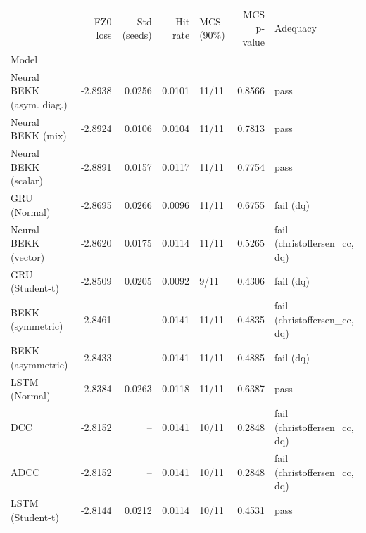 \begin{tabular}{lrrrlrl}
\toprule
 & FZ0 loss & Std (seeds) & Hit rate & MCS (90\%) & MCS p-value & Adequacy \\
Model &  &  &  &  &  &  \\
\midrule
Neural BEKK (asym. diag.) & -2.8938 & 0.0256 & 0.0101 & 11/11 & 0.8566 & pass \\
Neural BEKK (mix) & -2.8924 & 0.0106 & 0.0104 & 11/11 & 0.7813 & pass \\
Neural BEKK (scalar) & -2.8891 & 0.0157 & 0.0117 & 11/11 & 0.7754 & pass \\
GRU (Normal) & -2.8695 & 0.0266 & 0.0096 & 11/11 & 0.6755 & fail (dq) \\
Neural BEKK (vector) & -2.8620 & 0.0175 & 0.0114 & 11/11 & 0.5265 & fail (christoffersen\_cc, dq) \\
GRU (Student-t) & -2.8509 & 0.0205 & 0.0092 & 9/11 & 0.4306 & fail (dq) \\
BEKK (symmetric) & -2.8461 & -- & 0.0141 & 11/11 & 0.4835 & fail (christoffersen\_cc, dq) \\
BEKK (asymmetric) & -2.8433 & -- & 0.0141 & 11/11 & 0.4885 & fail (dq) \\
LSTM (Normal) & -2.8384 & 0.0263 & 0.0118 & 11/11 & 0.6387 & pass \\
DCC & -2.8152 & -- & 0.0141 & 10/11 & 0.2848 & fail (christoffersen\_cc, dq) \\
ADCC & -2.8152 & -- & 0.0141 & 10/11 & 0.2848 & fail (christoffersen\_cc, dq) \\
LSTM (Student-t) & -2.8144 & 0.0212 & 0.0114 & 10/11 & 0.4531 & pass \\
\bottomrule
\end{tabular}
